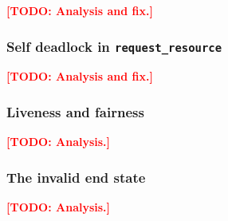 \documentclass[11pt,a4paper]{article}
\newcommand{\code}[1]{\texttt{#1}}
\newcommand{\todo}[1]{\textcolor{red}{\textbf{[TODO: #1]}}}
\begin{document}
\todo{Analysis and fix.}

\subsubsection*{Self deadlock in \code{request\_resource}}


\todo{Analysis and fix.}

\subsubsection*{Liveness and fairness}


\todo{Analysis.}

\subsubsection*{The invalid end state}


\todo{Analysis.}
\end{document}
